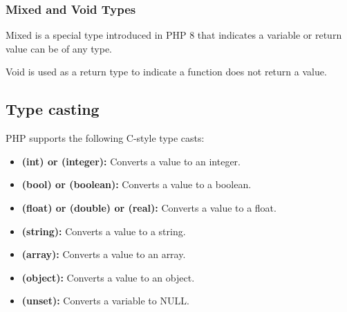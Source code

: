 \documentclass{report}
\begin{document}
\bigbreak \noindent 
\subsubsection{Mixed and Void Types}
\bigbreak \noindent 
Mixed is a special type introduced in PHP 8 that indicates a variable or return value can be of any type.
\bigbreak \noindent 
{}
\bigbreak \noindent 
Void is used as a return type to indicate a function does not return a value.
\bigbreak \noindent 
{}

\pagebreak 
\subsection{Type casting}
\bigbreak \noindent 
PHP supports the following C-style type casts:
\bigbreak \noindent 
\begin{itemize}
    \item \textbf{(int) or (integer):} Converts a value to an integer.
    \item \textbf{(bool) or (boolean):} Converts a value to a boolean.
    \item \textbf{(float) or (double) or (real):} Converts a value to a float.
    \item \textbf{(string):} Converts a value to a string.
    \item \textbf{(array):} Converts a value to an array.
    \item \textbf{(object):} Converts a value to an object.
    \item \textbf{(unset):} Converts a variable to NULL.
\end{itemize}

\bigbreak \noindent 
\end{document}
